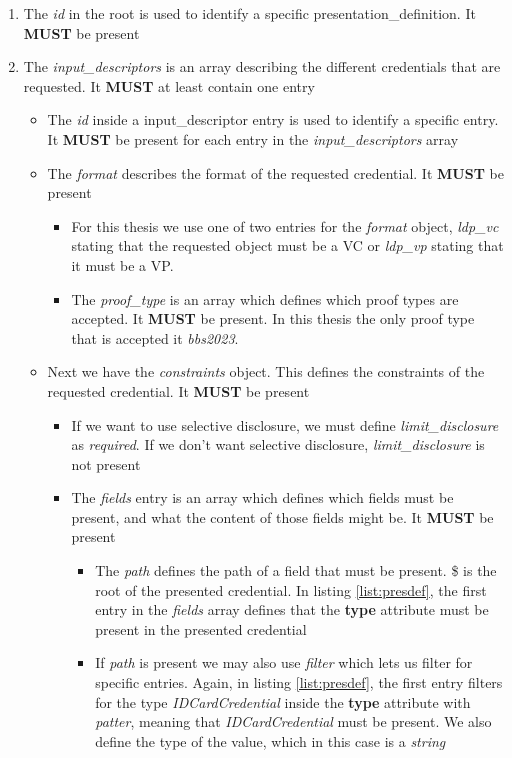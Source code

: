 \documentclass[
	a4paper               %
	,BCOR=0mm            %
	,bibliography=totoc   %
	,listof=totoc         %
	,monolingual
	,twoside=false
]{bfhthesis}              %
\begin{document}
\begin{enumerate}
	\item The \textit{id} in the root is used to identify a specific presentation\_definition. It \textbf{MUST} be present
	\item The \textit{input\_descriptors} is an array describing the different credentials that are requested. It \textbf{MUST} at least contain one entry
	\begin{itemize}
		\item The \textit{id} inside a input\_descriptor entry is used to identify a specific entry. It \textbf{MUST} be present for each entry in the \textit{input\_descriptors} array
		\item The \textit{format} describes the format of the requested credential. It \textbf{MUST} be present
		\begin{itemize}
			\item For this thesis we use one of two entries for the \textit{format} object, \textit{ldp\_vc} stating that the requested object must be a VC or \textit{ldp\_vp} stating that it must be a VP.
			\item The \textit{proof\_type} is an array which defines which proof types are accepted. It \textbf{MUST} be present. In this thesis the only proof type that is accepted it \textit{bbs2023}.
		\end{itemize}
		\item Next we have the \textit{constraints} object. This defines the constraints of the requested credential. It \textbf{MUST} be present
		\begin{itemize}
			\item If we want to use selective disclosure, we must define \textit{limit\_disclosure} as \textit{required}. If we don't want selective disclosure, \textit{limit\_disclosure} is not present
			\item The \textit{fields} entry is an array which defines which fields must be present, and what the content of those fields might be. It \textbf{MUST} be present
			\begin{itemize}
				\item The \textit{path} defines the path of a field that must be present. \$ is the root of the presented credential. In listing \ref{list:presdef}, the first entry in the \textit{fields} array defines that the \textbf{type} attribute must be present in the presented credential
				\item If \textit{path} is present we may also use \textit{filter} which lets us filter for specific entries. Again, in listing \ref{list:presdef}, the first entry filters for the type \textit{IDCardCredential} inside the \textbf{type} attribute with \textit{patter}, meaning that \textit{IDCardCredential} must be present. We also define the type of the value, which in this case is a \textit{string}

\end{itemize}
\end{itemize}
\end{itemize}
\end{enumerate}
\end{document}
